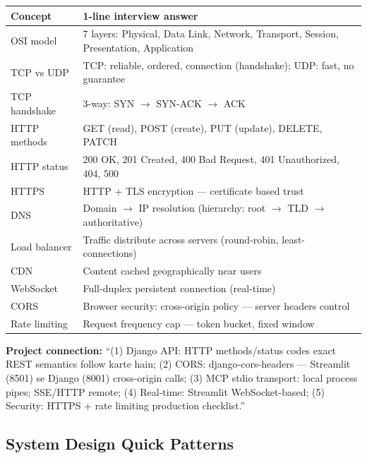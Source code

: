 \begin{longtable}{p{4.5cm} p{9.5cm}}
\toprule
\textbf{Concept} & \textbf{1-line interview answer} \\
\midrule
OSI model & 7 layers: Physical, Data Link, Network, Transport, Session, Presentation, Application \\
TCP vs UDP & TCP: reliable, ordered, connection (handshake); UDP: fast, no guarantee \\
TCP handshake & 3-way: SYN $\rightarrow$ SYN-ACK $\rightarrow$ ACK \\
HTTP methods & GET (read), POST (create), PUT (update), DELETE, PATCH \\
HTTP status & 200 OK, 201 Created, 400 Bad Request, 401 Unauthorized, 404, 500 \\
HTTPS & HTTP + TLS encryption --- certificate based trust \\
DNS & Domain $\rightarrow$ IP resolution (hierarchy: root $\rightarrow$ TLD $\rightarrow$ authoritative) \\
Load balancer & Traffic distribute across servers (round-robin, least-connections) \\
CDN & Content cached geographically near users \\
WebSocket & Full-duplex persistent connection (real-time) \\
CORS & Browser security: cross-origin policy --- server headers control \\
Rate limiting & Request frequency cap --- token bucket, fixed window \\
\bottomrule
\end{longtable}

\begin{interviewbox}
\textbf{Project connection:} ``(1) Django API: HTTP methods/status codes exact REST semantics follow karte hain; (2) CORS: django-cors-headers --- Streamlit (8501) se Django (8001) cross-origin calls; (3) MCP stdio transport: local process pipes; SSE/HTTP remote; (4) Real-time: Streamlit WebSocket-based; (5) Security: HTTPS + rate limiting production checklist.''
\end{interviewbox}

\subsection{System Design Quick Patterns}

